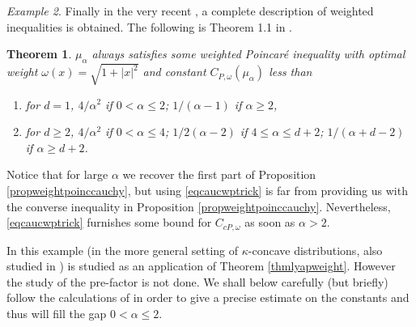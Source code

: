 \documentclass[11pt,reqno]{amsart}
\numberwithin{equation}{section}
\newtheorem{theorem}{Theorem}[section]
\theoremstyle{definition}
\theoremstyle{remark}
\newtheorem{example}[theorem]{Example}
\begin{document}
\begin{example}
Finally in the very recent \cite{Hug}, a complete description of weighted inequalities is obtained. The following is Theorem 1.1 in \cite{Hug}.
\begin{theorem}\label{thmweightpoinccauchy}
$\mu_\alpha$ always satisfies some weighted Poincar\'e inequality with optimal weight $\omega(x)=\sqrt{1+|x|^2}$ and constant $C_{P,\omega}(\mu_\alpha)$ less than
\begin{enumerate}
\item[(1)] \quad for $d=1$, $4/\alpha^2$ if $0<\alpha\leq 2$; $1/(\alpha-1)$ if $\alpha\geq 2$,
\item[(2)] \quad for $d \geq 2$, $4/\alpha^2$ if $0<\alpha\leq 4$; $1/2(\alpha-2)$ if $4\leq \alpha\leq d+2$; $1/(\alpha+d-2)$ if $\alpha \geq d+2$.
\end{enumerate}
\end{theorem}
Notice that for large $\alpha$ we recover the first part of Proposition \ref{propweightpoinccauchy}, but using \eqref{eqcaucwptrick} is far from providing us with the converse inequality in Proposition \ref{propweightpoinccauchy}. Nevertheless, \eqref{eqcaucwptrick} furnishes some bound for $C_{cP,\omega}$ as soon as $\alpha > 2$.


In \cite{CGGR} this example (in the more general setting of $\kappa$-concave distributions, also studied in \cite{BLweight2}) is studied as an application of Theorem \ref{thmlyapweight}. However the study of the pre-factor is not done. We shall below carefully (but briefly) follow the calculations of \cite{CGGR} in order to give a precise estimate on the constants and thus will fill the gap $0<\alpha \leq 2$.


\end{example}
\end{document}
